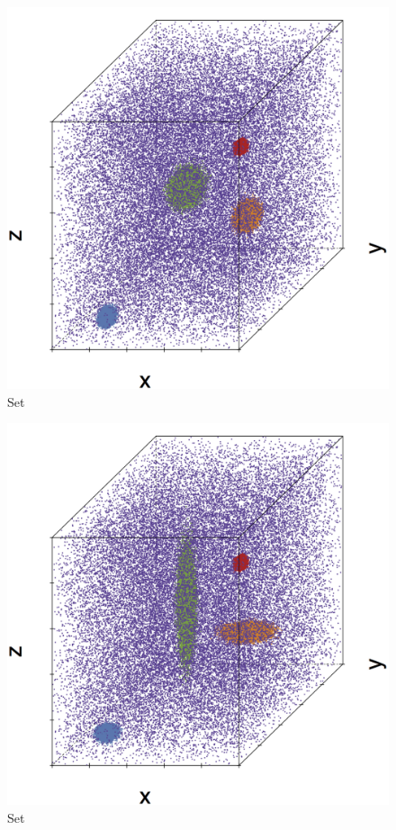\begin{subfigure}{0.23\textwidth}
	\centering
	\includegraphics[width=\textwidth]{experiment/img/datasetplot_ferdosi_3_120000.png}
	\caption{Set \ferdosiThree}
	\label{fig:3:simulated:datasets:ferdosi3}
\end{subfigure}			
\begin{subfigure}{0.23\textwidth}
	\centering
	\includegraphics[width=\textwidth]{experiment/img/datasetplot_baakman_3_120000.png}
	\caption{Set \baakmanThree}
	\label{fig:3:simulated:datasets:baakman3}
\end{subfigure}